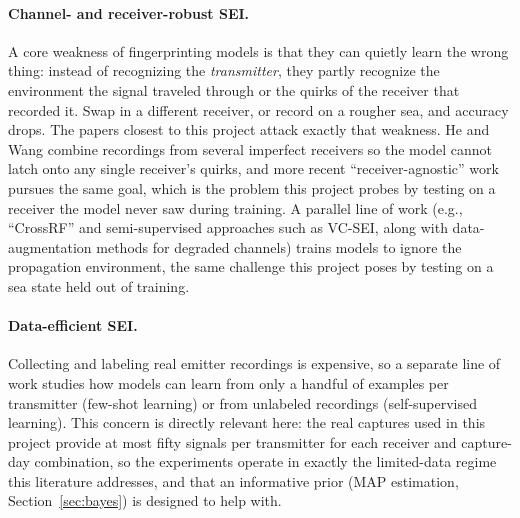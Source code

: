 \documentclass{article}
\begin{document}
\paragraph{Channel- and receiver-robust SEI.}
A core weakness of fingerprinting models is that they can quietly learn the wrong thing:
instead of recognizing the \emph{transmitter}, they partly recognize the environment the
signal traveled through or the quirks of the receiver that recorded it. Swap in a
different receiver, or record on a rougher sea, and accuracy drops. The papers closest to
this project attack exactly that weakness. He and Wang \citep{he2020} combine recordings
from several imperfect receivers so the model cannot latch onto any single receiver's
quirks, and more recent ``receiver-agnostic'' work pursues the same goal, which is the
problem this project probes by testing on a receiver the model never saw during training.
A parallel line of work (e.g., ``CrossRF'' and semi-supervised approaches such as VC-SEI,
along with data-augmentation methods for degraded channels) trains models to ignore the
propagation environment, the same challenge this project poses by testing on a sea
state held out of training.

\paragraph{Data-efficient SEI.}
Collecting and labeling real emitter recordings is expensive, so a separate line of work
studies how models can learn from only a handful of examples per transmitter (few-shot
learning) or from unlabeled recordings (self-supervised learning). This concern is
directly relevant here: the real captures used in this project provide at most fifty
signals per transmitter for each receiver and capture-day combination, so the experiments
operate in exactly the limited-data regime this literature addresses, and that an
informative prior (MAP estimation, Section~\ref{sec:bayes}) is designed to help with.
\end{document}
